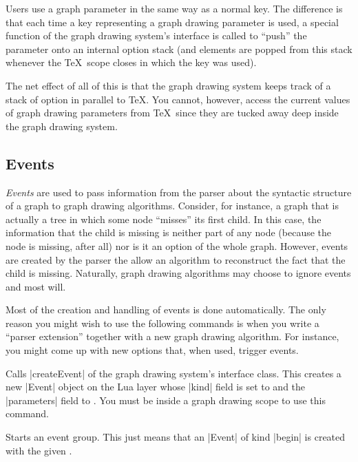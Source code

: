 Users use a graph parameter in the same way as a normal key. The difference is
that each time a key representing a graph drawing parameter is used, a special
function of the graph drawing system's interface is called to ``push'' the
parameter onto an internal option stack (and elements are popped from this
stack whenever the \TeX\ scope closes in which the key was used).

The net effect of all of this is that the graph drawing system keeps track of a
stack of option in parallel to \TeX. You cannot, however, access the current
values of graph drawing parameters from \TeX\ since they are tucked away deep
inside the graph drawing system.


\subsection{Events}

\emph{Events} are used to pass information from the parser about the syntactic
structure of a graph to graph drawing algorithms. Consider, for instance, a
graph that is actually a tree in which some node ``misses'' its first child. In
this case, the information that the child is missing is neither part of any
node (because the node is missing, after all) nor is it an option of the whole
graph. However, events are created by the parser the allow an algorithm to
reconstruct the fact that the child is missing. Naturally, graph drawing
algorithms may choose to ignore events and most will.

Most of the creation and handling of events is done automatically. The only
reason you might wish to use the following commands is when you write a
``parser extension'' together with a new graph drawing algorithm. For instance,
you might come up with new options that, when used, trigger events.

\begin{command}{\pgfgdevent{}}
    Calls |createEvent| of the graph drawing system's interface class. This
    creates a new |Event| object on the Lua layer whose |kind| field is set to
     and the |parameters| field to . You must be
    inside a graph drawing scope to use this command.
\end{command}

\begin{command}{\pgfgdbegineventgroup{}}
    Starts an event group. This just means that an |Event| of kind |begin| is
    created with the given .
\end{command}

